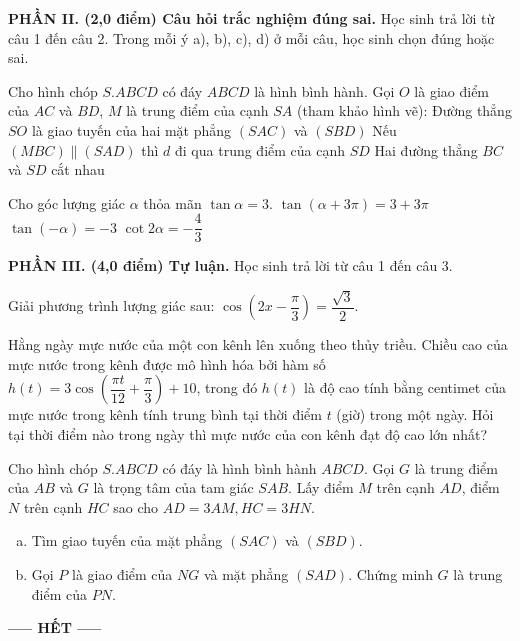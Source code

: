 \documentclass[11pt,a4paper,oneside]{article}
\begin{document}
\noindent \textbf{PHẦN II. (2,0 điểm) Câu hỏi trắc nghiệm đúng sai.} Học sinh trả lời từ câu 1 đến câu 2. Trong mỗi ý a), b), c), d) ở mỗi câu, học sinh chọn đúng hoặc sai.
\setcounter{ex}{0}
	\begin{ex}
Cho hình chóp $S.ABCD$ có đáy $ABCD$ là hình bình hành. Gọi $O$ là giao điểm của $AC$ và $BD$, $M$ là trung điểm của cạnh $SA$ (tham khảo hình vẽ):
{Đường thẳng $SO$ là giao tuyến của hai mặt phẳng $(SAC)$ và $(SBD)$}
{Nếu $(MBC) \parallel (SAD)$ thì $d$ đi qua trung điểm của cạnh $SD$}
{Hai đường thẳng $BC$ và $SD$ cắt nhau}
	\loigiai{
	}
	\end{ex}
	\begin{ex}
Cho góc lượng giác $\alpha$ thỏa mãn $\tan \alpha = 3$.
	\choiceTF[t]
	{$\cot \alpha = \dfrac{1}{3}$}
	{$\tan(\alpha + 3\pi) = 3 + 3\pi$}
	{$\tan(-\alpha) = -3$}
	{$\cot 2\alpha = -\dfrac{4}{3}$}
	\loigiai{
	}
	\end{ex}
\textbf{PHẦN III. (4,0 điểm) Tự luận.} Học sinh trả lời từ câu 1 đến câu 3.
\setcounter{ex}{0}
	\begin{ex}
 Giải phương trình lượng giác sau: $\cos \left( 2x - \dfrac{\pi}{3} \right) = \dfrac{\sqrt{3}}{2}$.
	\loigiai{
	}
	\end{ex}
	\begin{ex}
Hằng ngày mực nước của một con kênh lên xuống theo thủy triều. Chiều cao của mực nước trong kênh được mô hình hóa bởi hàm số $h(t) = 3 \cos \left( \dfrac{\pi t}{12} + \dfrac{\pi}{3} \right) + 10$, trong đó $h(t)$ là độ cao tính bằng centimet của mực nước trong kênh tính trung bình tại thời điểm $t$ (giờ) trong một ngày. Hỏi tại thời điểm nào trong ngày thì mực nước của con kênh đạt độ cao lớn nhất?
	\loigiai{
	}
	\end{ex}
	\begin{ex}
Cho hình chóp $S.ABCD$ có đáy là hình bình hành $ABCD$. Gọi $G$ là trung điểm của $AB$ và $G$ là trọng tâm của tam giác $SAB$. Lấy điểm $M$ trên cạnh $AD$, điểm $N$ trên cạnh $HC$ sao cho $AD = 3AM, HC = 3HN$.
	\begin{enumerate}[a)]
	\item Tìm giao tuyến của mặt phẳng $(SAC)$ và $(SBD)$.
	\item Gọi $P$ là giao điểm của $NG$ và mặt phẳng $(SAD)$. Chứng minh $G$ là trung điểm của $PN$.
	\end{enumerate}
	\loigiai{
	}
	\end{ex}

	\centerline{\textbf{----- HẾT -----}}
\end{document}
